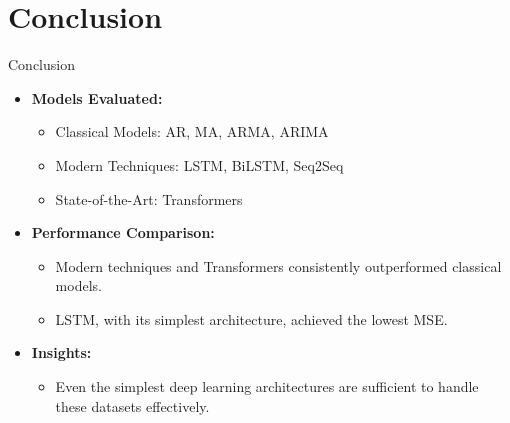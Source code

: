 \documentclass[aspectratio=16 9,10pt]{beamer}
\begin{document}
\section{Conclusion}
\begin{frame}{Conclusion}
    \begin{itemize}
        \item \textbf{Models Evaluated:}
        \begin{itemize}
            \item Classical Models: AR, MA, ARMA, ARIMA
            \item Modern Techniques: LSTM, BiLSTM, Seq2Seq
            \item State-of-the-Art: Transformers
        \end{itemize}
        
        \item \textbf{Performance Comparison:}
        \begin{itemize}
            \item Modern techniques and Transformers consistently outperformed classical models.
            \item LSTM, with its simplest architecture, achieved the lowest MSE.
        \end{itemize}
        
        \item \textbf{Insights:}
        \begin{itemize}
            \item Even the simplest deep learning architectures are sufficient to handle these datasets effectively.
        \end{itemize}
    \end{itemize}
\end{frame}
\end{document}

